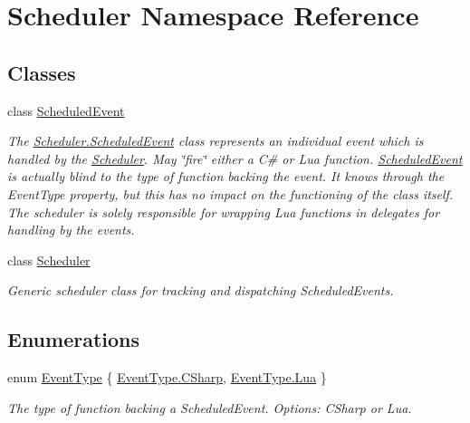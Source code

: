\hypertarget{namespace_scheduler}{}\section{Scheduler Namespace Reference}
\label{namespace_scheduler}
\subsection*{Classes}
\begin{DoxyCompactItemize}
\item 
class \hyperlink{class_scheduler_1_1_scheduled_event}{Scheduled\+Event}
\begin{DoxyCompactList}\small\item\em The \hyperlink{class_scheduler_1_1_scheduled_event}{Scheduler.\+Scheduled\+Event} class represents an individual event which is handled by the \hyperlink{class_scheduler_1_1_scheduler}{Scheduler}. May \char`\"{}fire\char`\"{} either a C\# or Lua function. \hyperlink{class_scheduler_1_1_scheduled_event}{Scheduled\+Event} is actually blind to the type of function backing the event. It knows through the Event\+Type property, but this has no impact on the functioning of the class itself. The scheduler is solely responsible for wrapping Lua functions in delegates for handling by the events. \end{DoxyCompactList}\item 
class \hyperlink{class_scheduler_1_1_scheduler}{Scheduler}
\begin{DoxyCompactList}\small\item\em Generic scheduler class for tracking and dispatching Scheduled\+Events. \end{DoxyCompactList}\end{DoxyCompactItemize}
\subsection*{Enumerations}
\begin{DoxyCompactItemize}
\item 
enum \hyperlink{namespace_scheduler_a85a4e27de37756a9765a49f3b3e4ba81}{Event\+Type} \{ \hyperlink{namespace_scheduler_a85a4e27de37756a9765a49f3b3e4ba81a83925001a044cdfe0c64e9a44345b66d}{Event\+Type.\+C\+Sharp}, 
\hyperlink{namespace_scheduler_a85a4e27de37756a9765a49f3b3e4ba81a0ae9478a1db9d1e2c48efa49eac1c7c6}{Event\+Type.\+Lua}
 \}\begin{DoxyCompactList}\small\item\em The type of function backing a Scheduled\+Event. Options\+: C\+Sharp or Lua. \end{DoxyCompactList}
\end{DoxyCompactItemize}


